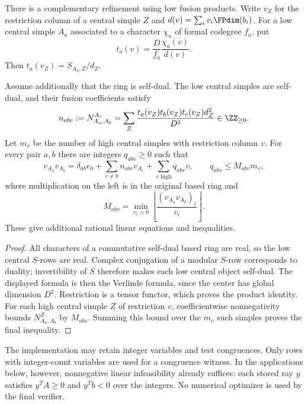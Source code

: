 There is a complementary refinement using low fusion products.  Write
$v_Z$ for the restriction column of a central simple $Z$ and
$d(v)=\sum_i v_i\FPdim(b_i)$.  For a low central simple $A_a$ associated
to a character $\chi_a$ of formal codegree $f_a$, put
\[
 t_a(v)=\frac{D}{f_a}\frac{\chi_a(v)}{d(v)}.
\]
Then $t_a(v_Z)=S_{A_a,Z}/d_Z$.

\begin{proposition}
\label{prop:round3-low-verlinde}
Assume additionally that the ring is self-dual.  The low central
simples are self-dual, and their fusion coefficients satisfy
\[
 n_{abc}:=N_{A_a,A_b}^{A_c}
 =\sum_Z\frac{t_a(v_Z)t_b(v_Z)t_c(v_Z)d_Z^2}{D^2}
 \in\ZZ_{\ge0}.
\]
Let $m_v$ be the number of high central simples with restriction
column $v$.  For every pair $a,b$ there are integers $q_{abv}\ge0$
such that
\[
 v_{A_a}v_{A_b}
 =\delta_{ab}e_0+\sum_{c\ne0}n_{abc}v_{A_c}
       +\sum_{v\text{ high}}q_{abv}v,
 \qquad
 q_{abv}\le M_{abv}m_v,
\]
where multiplication on the left is in the original based ring and
\[
 M_{abv}=\min_{v_i>0}
 \left\lfloor\frac{(v_{A_a}v_{A_b})_i}{v_i}\right\rfloor.
\]
These give additional rational linear equations and inequalities.
\end{proposition}
\begin{proof}
All characters of a commutative self-dual based ring are real, so the
low central $S$-rows are real.  Complex conjugation of a modular
$S$-row corresponds to duality; invertibility of $S$ therefore makes
each low central object self-dual.  The displayed formula is then the
Verlinde formula, since the center has global dimension $D^2$.
Restriction is a tensor functor, which proves the product identity.
For each high central simple $Z$ of restriction $v$, coefficientwise
nonnegativity bounds $N_{A_a,A_b}^Z$ by $M_{abv}$.  Summing this bound
over the $m_v$ such simples proves the final inequality.
\end{proof}

The implementation may retain integer variables and test congruences.
Only rows with integer-count variables are used for a congruence
witness.  In the applications below, however, nonnegative linear
infeasibility already suffices: each stored ray $y$ satisfies
$y^TA\ge0$ and $y^Tb<0$ over the integers.  No numerical optimizer is
used by the final verifier.

